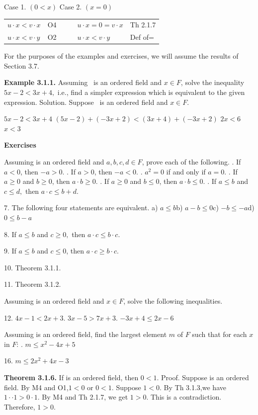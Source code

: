 \begin{large}
Case 1. $(0 < x)$ \qqu Case 2. $(x = 0)$
\begin{tabular}{l l l l l l}
$u\cdot x <v\cdot x$ &O4& & & $u\cdot x = 0 =v\cdot x$& Th 2.1.7 \\
$u\cdot x < v\cdot y$& O2 &&&$u\cdot x < v\cdot y$ &Def of= \\
\end{tabular}\nl

For the purposes of the examples and exercises, we will assume the results of Section 3.7. \nl

\textbf{Example 3.1.1.} Assuming \of ~is an ordered field and $x\in F$, solve the inequality $5x - 2 < 3x + 4,$ i.e., find a simpler expression which is equivalent to the given expression. Solution.
Suppose \of ~is an ordered field and $x\in F.$\nl

$5x - 2 < 3x + 4$\nl
$( 5x-2) + (-3x + 2) < (3x + 4) + (-3x+2)$ \nl
$2x < 6$\nl
$x < 3$\nl

\newpage

\textbf{Exercises}\nl

Assuming \of is an ordered field and $a,b,c,d\in F$, prove each of the following. . If $a < 0$, then $-a > 0$. . If $a > 0$, then $-a < 0$. . $a^{2} =0$ if and only if $a = 0$. . If $a\geq 0$ and $b\geq 0$, then $a\cdot b\geq 0$. . If $a\geq 0$ and $b\leq 0$, then $a\cdot b\leq 0.$ . If $a\leq b$ and $c\leq d,$ then $a\cdot c\leq b + d.$ \nl

7. 	The following four statements are equivalent.\nl
 a) $a\leq b$\qquad b) $a-b\leq 0$\qquad  c) $-b\leq -a$\qquad d) $0\leq b-a$\nl

8. If $a\leq b$ and $c \geq 0,$ then $a\cdot c \leq b\cdot c.$\nl

9. If $a\leq b$ and $c\leq 0$, then $a\cdot c\geq b\cdot c.$\nl

10. Theorem 3.1.1. \nl

11. Theorem 3.1.2. \nl

Assuming \of  is an ordered field and $x\in F$, solve the following inequalities.\nl

12. $4x - 1 < 2x + 3 $. $3x - 5 > 7x + 3$. $-3x +4 \leq 2x - 6$\nl


Assuming \of is an ordered field, find the largest element $m$ of $F$ such that for each $x$ in $F$: . $m\leq x^{2} - 4x + 5$\nl

16. $m\leq 2x^{2} + 4x - 3 $\nl


\textbf{Theorem 3.1.6.} If \of  is an ordered field, then $0 < 1.$\nl
 Proof. Suppose \of  is an ordered field. By M4 and O1,$1 < 0$ or $0 < 1.$ Suppose $1 < 0.$ By Th 3.1.3,we have $1·\cdot 1 >0\cdot 1.$ By M4 and Th 2.1.7, we get $1 > 0.$   This is a contradiction. Therefore, $1 > 0.$ \nl


\end{large}
